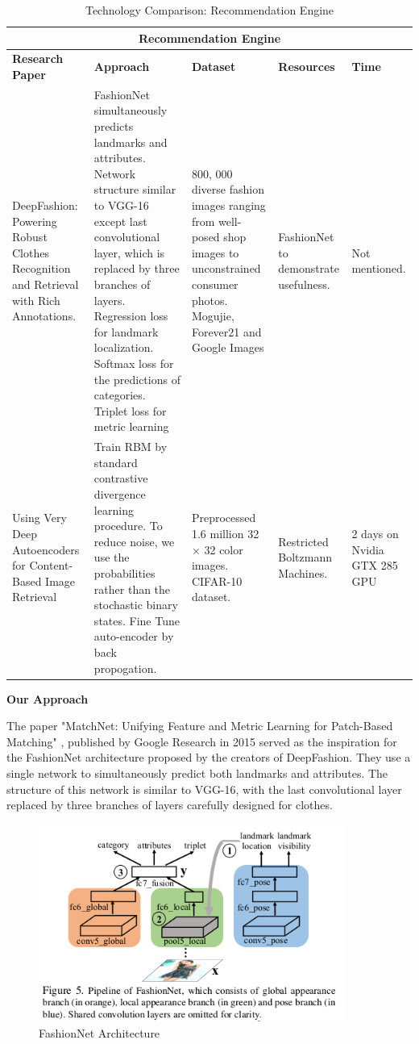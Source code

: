 \begin{table}[H]
\begin{tabular}{ @{}|p{3cm}|p{4cm}|p{2.5cm}|p{2.5cm}|p{2.5cm}|  }
 \hline
 \multicolumn{5}{|c|}{\textbf{Recommendation Engine}} \\
 \hline
 \textbf{Research Paper} & \textbf{Approach} & \textbf{Dataset} & \textbf{Resources} & \textbf{Time}\\
 \hline
 DeepFashion: Powering Robust Clothes Recognition and Retrieval with Rich Annotations. & FashionNet simultaneously predicts landmarks and attributes. Network structure similar to VGG-16 except last convolutional layer, which is replaced by three branches of layers. Regression loss for landmark localization. Softmax loss for the predictions of categories. Triplet loss for metric learning & 800, 000 diverse
 fashion images ranging from well-posed shop images to unconstrained consumer photos. 
 Mogujie, Forever21 and Google Images & FashionNet to demonstrate usefulness. & Not mentioned. \\
\hline

Using Very Deep Autoencoders for Content-Based Image Retrieval & Train RBM by standard contrastive divergence learning procedure. To reduce noise, we use the probabilities rather than the stochastic binary states. Fine Tune auto-encoder by back propogation.  & Preprocessed 1.6 million 32 × 32 color images. CIFAR-10 dataset. & Restricted Boltzmann Machines. & 2 days on Nvidia GTX 285 GPU \\
\hline

\end{tabular}
\caption{Technology Comparison: Recommendation Engine}
\label{table:recommendation-engine 3}
\end{table}


\textbf{Our Approach}
\newline

The paper "MatchNet: Unifying Feature and Metric Learning for Patch-Based Matching" \cite{matchnet}, published by Google Research in 2015 served as the inspiration for the FashionNet architecture proposed by the creators of DeepFashion. They use a single network to simultaneously predict both landmarks and attributes. The structure of this network is similar to VGG-16, with the last convolutional layer replaced by three branches of layers carefully designed for clothes.

\begin{figure}[H]
\includegraphics[width=10cm]{images/fashionnet-architecture.png} 
\centering
\caption{FashionNet Architecture \cite{deepfashion}}
\label{architecture}
\end{figure}

